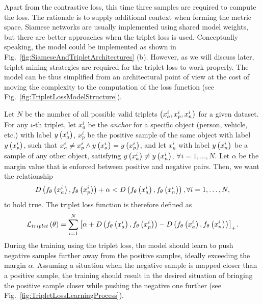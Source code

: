 Apart from the contrastive loss, this time three samples are required to compute the loss. The rationale is to supply additional context when forming the metric space. Siamese networks are usually implemented using shared model weights, but there are better approaches when the triplet loss is used. Conceptually speaking, the model could be implemented as shown in Fig.~\ref{fig:SiameseAndTripletArchitectures} (b). However, as we will discuss later, triplet mining strategies are required for the triplet loss to work properly. The model can be thus simplified from an architectural point of view at the cost of moving the complexity to the computation of the loss function (see Fig.~\ref{fig:TripletLossModelStructure}).

Let $N$ be the number of all possible valid triplets $\left( {x_a^i, x_p^i, x_n^i} \right)$ for a given dataset. For any $i$-th triplet, let $x_a^i$ be the \emph{anchor} for a specific object (person, vehicle, etc.) with label ${y} \left( x_a^i \right)$, $x_p^i$ be the positive sample of the same object with label ${y} \left( x_p^i \right)$, such that $x_a^i \neq x_p^i \land {y} \left( x_a^i \right) = {y} \left( x_p^i \right)$, and let $x_n^i$ with label ${y} \left( x_n^i \right)$ be a sample of any other object, satisfying ${y} \left( x_a^i \right) \neq {y} \left( x_n^i \right)$, $\forall i = 1, \dots, N$. Let $\alpha$ be the margin value that is enforced between positive and negative pairs. Then, we want the relationship~\cite{schroff2015facenet}
\begin{equation}
    \label{eq:TripletDistanceConstraint}
    {D} \left( {f_\theta} \left( x_a^i \right), {f_\theta} \left( x_p^i \right) \right) + \alpha < {D} \left( {f_\theta} \left( x_a^i \right), {f_\theta} \left( x_n^i \right) \right), \forall i = 1, \dots, N,
\end{equation}
to hold true. The triplet loss function is therefore defined as~\cite{schroff2015facenet}
\begin{equation}
    \label{eq:TripletLoss}
    {\mathcal{L}_{triplet}} \left( \theta \right) =
    \sum_{i = 1}^{N}
    {\left[ {
        \alpha +
        {D} \left( {f_\theta} \left( x_a^i \right), {f_\theta} \left( x_p^i \right) \right) -
        {D} \left( {f_\theta} \left( x_a^i \right), {f_\theta} \left( x_n^i \right) \right)
    } \right]}_+.
\end{equation}
During the training using the triplet loss, the model should learn to push negative samples further away from the positive samples, ideally exceeding the margin $\alpha$. Assuming a situation when the negative sample is mapped closer than a positive sample, the training should result in the desired situation of bringing the positive sample closer while pushing the negative one further (see Fig.~\ref{fig:TripletLossLearningProcess}).

